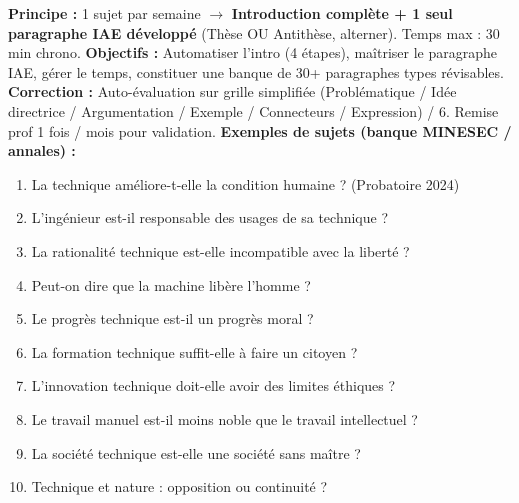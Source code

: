 \documentclass[11pt]{article}
\begin{document}
\begin{aretenir}
\textbf{Principe :} 1 sujet par semaine $\to$ \textbf{Introduction compl\`ete + 1 seul paragraphe IAE d\'evelopp\'e} (Th\`ese OU Antith\`ese, alterner). Temps max : 30 min chrono.
\textbf{Objectifs :} Automatiser l'intro (4 \'etapes), ma\^itriser le paragraphe IAE, g\'erer le temps, constituer une banque de 30+ paragraphes types r\'evisables.
\textbf{Correction :} Auto-\'evaluation sur grille simplifi\'ee (Probl\'ematique / Id\'ee directrice / Argumentation / Exemple / Connecteurs / Expression) / 6. Remise prof 1 fois / mois pour validation.
\textbf{Exemples de sujets (banque MINESEC / annales) :}
\begin{enumerate}
    \item La technique am\'eliore-t-elle la condition humaine ? (Probatoire 2024)
    \item L'ing\'enieur est-il responsable des usages de sa technique ?
    \item La rationalit\'e technique est-elle incompatible avec la libert\'e ?
    \item Peut-on dire que la machine lib\`ere l'homme ?
    \item Le progr\`es technique est-il un progr\`es moral ?
    \item La formation technique suffit-elle \`a faire un citoyen ?
    \item L'innovation technique doit-elle avoir des limites \'ethiques ?
    \item Le travail manuel est-il moins noble que le travail intellectuel ?
    \item La soci\'et\'e technique est-elle une soci\'et\'e sans ma\^itre ?
    \item Technique et nature : opposition ou continuit\'e ?
\end{enumerate}
\end{aretenir}
\end{document}

